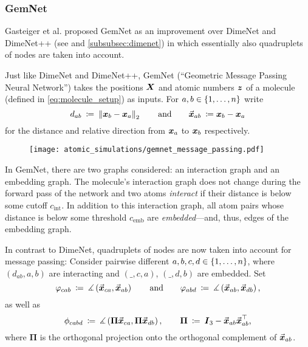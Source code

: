 \subsubsection{GemNet}
\label{subsubsec:gemnet}

Gasteiger et al. proposed GemNet \cite{https://doi.org/10.48550/arxiv.2106.08903} 
as an improvement over DimeNet and DimeNet++ (see 
\cite{DBLP:journals/corr/abs-2003-03123, https://doi.org/10.48550/arxiv.2011.14115} 
and \ref{subsubsec:dimenet}) in which essentially also quadruplets of nodes are
taken into account. 

Just like DimeNet and DimeNet++, GemNet (\enquote{Geometric Message Passing Neural Network}) 
takes the positions $\boldsymbol{X}$ and atomic numbers $\boldsymbol{z}$ of a molecule 
(defined in \eqref{eq:molecule_setup}) as inputs. For $a, b \in \left\{1, \dots, n\right\}$ write
\[
    d_{ab} \: \coloneqq \: \left\lVert\boldsymbol{x}_b - \boldsymbol{x}_a\right\rVert_2 
    \qquad \text{and} \qquad 
    \vec{\boldsymbol{x}}_{ab} \: \coloneqq \boldsymbol{x}_b - \boldsymbol{x}_a
\]
for the distance and relative direction from $\boldsymbol{x}_a$ to $\boldsymbol{x}_b$ respectively.
\begin{wrapfigure}{r}{0.3\textwidth}
    \centering
    \texttt{[image: atomic\_simulations/gemnet\_message\_passing.pdf]}
\end{wrapfigure}
In GemNet, there are two graphs considered: an interaction graph and an embedding graph.
The molecule's interaction graph does not change during the forward pass of the network and 
two atoms \textit{interact} if their distance is below some 
cutoff $c_{\text{int}}$. In addition to this interaction graph, all atom pairs 
whose distance is below some threshold $c_{\text{emb}}$ are \textit{embedded}---and, thus, 
edges of the embedding graph.

In contrast to DimeNet, quadruplets of nodes are now taken into account for message passing: 
Consider pairwise different $a, b, c, d \in \left\{1, \dots, n\right\}$,
where $(d_{ab}, a, b)$ are interacting and $(\_, c, a)$, $(\_, d, b)$ are
embedded. Set
\[
    \varphi_{cab} \: \coloneqq \: 
    \measuredangle \left( \vec{\boldsymbol{x}}_{ca}, \vec{\boldsymbol{x}}_{ab} \right)
    \qquad \text{and} \qquad
    \varphi_{abd} \: \coloneqq \: 
    \measuredangle \left( \vec{\boldsymbol{x}}_{ab}, \vec{\boldsymbol{x}}_{db} \right) \text{,}
\]
as well as 
\[
    \phi_{cabd} \: \coloneqq \: 
    \measuredangle \left( \boldsymbol{\Pi} \vec{\boldsymbol{x}}_{ca}, \boldsymbol{\Pi} \vec{\boldsymbol{x}}_{db} \right),
    \qquad \boldsymbol{\Pi} \: \coloneqq \: 
    \boldsymbol{I}_3 - \vec{\boldsymbol{x}}_{ab} \vec{\boldsymbol{x}}_{ab}^\top \text{,}
\]
where $\boldsymbol{\Pi}$ is the orthogonal projection onto the orthogonal
complement of $\vec{\boldsymbol{x}}_{ab}$.

